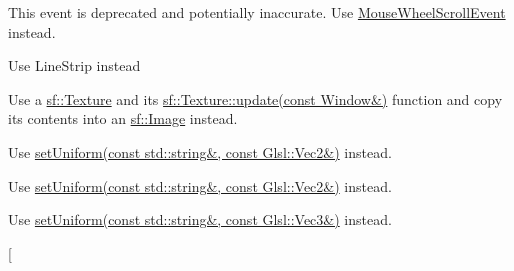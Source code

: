 
\begin{DoxyRefList}
\item[\label{deprecated__deprecated000017}%
\Hypertarget{deprecated__deprecated000017}%
Class \hyperlink{structsf_1_1_event_1_1_mouse_wheel_event}{sf\+:\+:Event\+:\+:Mouse\+Wheel\+Event} ]This event is deprecated and potentially inaccurate. Use \hyperlink{structsf_1_1_event_1_1_mouse_wheel_scroll_event}{Mouse\+Wheel\+Scroll\+Event} instead. 
\item[\label{deprecated__deprecated000001}%
\Hypertarget{deprecated__deprecated000001}%
Member \hyperlink{group__graphics_gga5ee56ac1339984909610713096283b1ba5b09910f5d0f39641342184ccd0d1de3}{sf\+:\+:Lines\+Strip} ]Use Line\+Strip instead  
\item[\label{deprecated__deprecated000004}%
\Hypertarget{deprecated__deprecated000004}%
Member \hyperlink{classsf_1_1_render_window_a370137abe81f6b7d62b600ceeccd54d3}{sf\+:\+:Render\+Window\+:\+:capture} () const]Use a \hyperlink{classsf_1_1_texture}{sf\+::\+Texture} and its \hyperlink{classsf_1_1_texture_ad3cceef238f7d5d2108a98dd38c17fc5}{sf\+::\+Texture\+::update(const Window\&)} function and copy its contents into an \hyperlink{classsf_1_1_image}{sf\+::\+Image} instead.  
\item[\label{deprecated__deprecated000009}%
\Hypertarget{deprecated__deprecated000009}%
Member \hyperlink{classsf_1_1_shader_aee671dda9a84f607b9b780b2796def74}{sf\+:\+:Shader\+:\+:set\+Parameter} (const std\+::string \&name, const Vector2f \&vector)]Use \hyperlink{classsf_1_1_shader_a4a2c673c41e37b17d67e4af1298b679f}{set\+Uniform(const std\+::string\&, const Glsl\+::\+Vec2\&)} instead. 
\item[\label{deprecated__deprecated000006}%
\Hypertarget{deprecated__deprecated000006}%
Member \hyperlink{classsf_1_1_shader_a61f5cdb5847fc3b57335b095a2f3dad3}{sf\+:\+:Shader\+:\+:set\+Parameter} (const std\+::string \&name, float x, float y)]Use \hyperlink{classsf_1_1_shader_a4a2c673c41e37b17d67e4af1298b679f}{set\+Uniform(const std\+::string\&, const Glsl\+::\+Vec2\&)} instead. 
\item[\label{deprecated__deprecated000010}%
\Hypertarget{deprecated__deprecated000010}%
Member \hyperlink{classsf_1_1_shader_abf1eb5e74f216c7bcfaf34d08c960ee0}{sf\+:\+:Shader\+:\+:set\+Parameter} (const std\+::string \&name, const Vector3f \&vector)]Use \hyperlink{classsf_1_1_shader_aad654ad8de6f0c56191fa7b8cea21db2}{set\+Uniform(const std\+::string\&, const Glsl\+::\+Vec3\&)} instead. 
\item[\label{deprecated__deprecated000011}%

\end{DoxyRefList}
